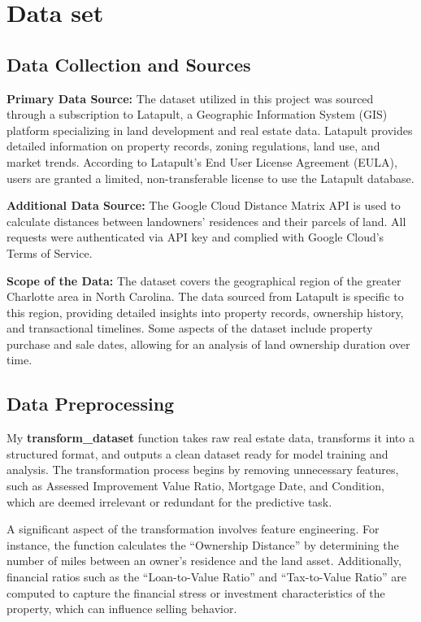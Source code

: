 \section{Data set }

\subsection{Data Collection and Sources}
\textbf{Primary Data Source: } The dataset utilized in this project was sourced through a subscription to Latapult, a Geographic Information System (GIS) platform specializing in land development and real estate data. Latapult provides detailed information on property records, zoning regulations, land use, and market trends. According to Latapult's End User License Agreement (EULA), users are granted a limited, non-transferable license to use the Latapult database.

\textbf{Additional Data Source: } The Google Cloud Distance Matrix API is used to calculate distances between landowners’ residences and their parcels of land. All requests were authenticated via API key and complied with Google Cloud's Terms of Service.

\textbf{Scope of the Data: } The dataset covers the geographical region of the greater Charlotte area in North Carolina. The data sourced from Latapult is specific to this region, providing detailed insights into property records, ownership history, and transactional timelines. Some aspects of the dataset include property purchase and sale dates, allowing for an analysis of land ownership duration over time.

\subsection{Data Preprocessing}

My \textbf{transform\_dataset} function takes raw real estate data, transforms it into a structured format, and outputs a clean dataset ready for model training and analysis. The transformation process begins by removing unnecessary features, such as Assessed Improvement Value Ratio, Mortgage Date, and Condition, which are deemed irrelevant or redundant for the predictive task.

A significant aspect of the transformation involves feature engineering. For instance, the function calculates the “Ownership Distance” by determining the number of miles between an owner's residence and the land asset. Additionally, financial ratios such as the “Loan-to-Value Ratio” and “Tax-to-Value Ratio” are computed to capture the financial stress or investment characteristics of the property, which can influence selling behavior. 

